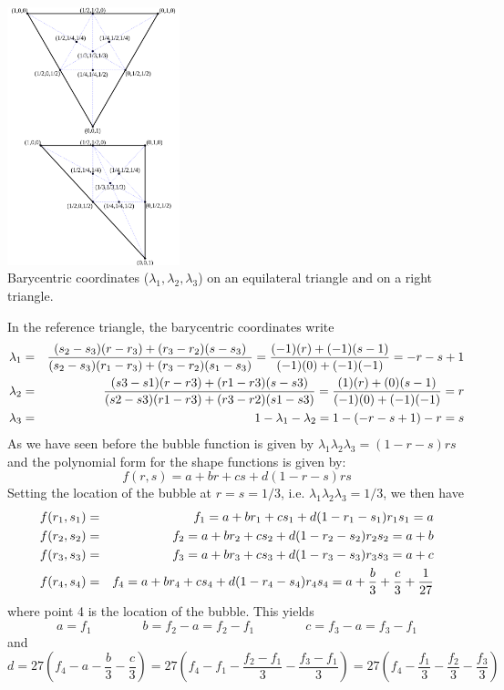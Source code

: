 \begin{center}
\includegraphics[width=5cm]{images/mini/barycoord}\\
{\small Barycentric coordinates ($\lambda _{1},\lambda _{2},\lambda _{3}$) on an equilateral triangle and on a right triangle.}
\end{center}

In the reference triangle, the barycentric coordinates write
\begin{eqnarray}
\lambda_1 &=& \frac{(s_2-s_3)(r-r_3)+(r_3-r_2)(s-s_3)}{(s_2-s_3)(r_1-r_3)+(r_3-r_2)(s_1-s_3)} = \frac{(-1)(r)+(-1)(s-1)}{(-1)(0)+(-1)(-1)} = -r-s+1  \nonumber\\
\lambda_2 &=& \frac{(s3-s1)(r-r3)+(r1-r3)(s-s3)}{(s2-s3)(r1-r3)+(r3-r2)(s1-s3)} = \frac{(1)(r)+(0)(s-1)}{(-1)(0)+(-1)(-1)} = r \nonumber\\
\lambda_3 &=& 1-\lambda_1-\lambda_2 = 1 - (-r-s+1) - r = s \nonumber
\end{eqnarray}
As we have seen before the bubble function is given by $\lambda_1\lambda_2\lambda_3 = (1-r-s)rs$
and the polynomial form for the shape functions is given by:
\[
f(r,s) =a+br+cs + d (1-r-s)rs
\]
Setting the location of the bubble at $r=s=1/3$, i.e. $\lambda_1\lambda_2\lambda_3 = 1/3$, 
we then have 
\begin{eqnarray}
f(r_1,s_1)&=&f_1 = a+br_1+cs_1 + d (1-r_1-s_1)r_1s_1 = a \nonumber\\
f(r_2,s_2)&=&f_2 = a+br_2+cs_2 + d (1-r_2-s_2)r_2s_2 = a + b \nonumber\\
f(r_3,s_3)&=&f_3 = a+br_3+cs_3 + d (1-r_3-s_3)r_3s_3 = a + c \nonumber\\
f(r_4,s_4)&=&f_4 = a+br_4+cs_4 + d (1-r_4-s_4)r_4s_4 = a + \frac{b}{3} + \frac{c}{3} + \frac{1}{27} \nonumber
\end{eqnarray}
where point 4 is the location of the bubble.
This yields
\[
a=f_1 
\quad\quad\qquad
b=f_2-a = f_2-f_1
\quad\quad\qquad
c=f_3-a = f_3-f_1
\]
and
\[
d=27(f_4-a-\frac{b}{3} - \frac{c}{3}) = 27 (f_4 - f_1 - \frac{f_2-f_1}{3} - \frac{f_3-f_1}{3} )
=27(f_4 - \frac{f_1}{3}  - \frac{f_2}{3}  - \frac{f_3}{3} )
\] 

